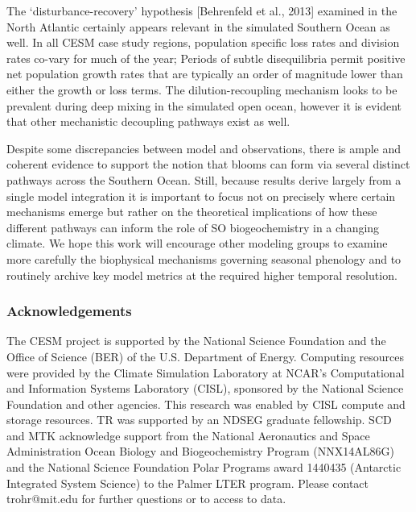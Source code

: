 The `disturbance-recovery' hypothesis [Behrenfeld et al., 2013] examined in the North Atlantic certainly appears relevant in the simulated Southern Ocean as well. In all CESM case study regions, population specific loss rates and division rates co-vary for much of the year; Periods of subtle disequilibria permit positive net population growth rates that are typically an order of magnitude lower than either the growth or loss terms. The dilution-recoupling mechanism looks to be prevalent during deep mixing in the simulated open ocean, however it is evident that other mechanistic decoupling pathways exist as well.

Despite some discrepancies between model and observations, there is ample and coherent evidence to support the notion that blooms can form via several distinct pathways across the Southern Ocean. Still, because results derive largely from a single model integration it is important to focus not on precisely where certain mechanisms emerge but rather on the theoretical implications of how these different pathways can inform the role of SO biogeochemistry in a changing climate. We hope this work will encourage other modeling groups to examine more carefully the biophysical mechanisms governing seasonal phenology and to routinely archive key model metrics at the required higher temporal resolution.

\subsubsection{Acknowledgements}
The CESM project is supported by the National Science Foundation and the Office of Science (BER) of the U.S. Department of Energy. Computing resources were provided by the Climate Simulation Laboratory at NCAR’s Computational and Information Systems Laboratory (CISL), sponsored by the National Science Foundation and other agencies. This research was enabled by CISL compute and storage resources. TR was supported by an NDSEG graduate fellowship. SCD and  MTK acknowledge support from the National Aeronautics and Space Administration Ocean Biology and Biogeochemistry Program (NNX14AL86G) and the National Science Foundation Polar Programs award 1440435 (Antarctic Integrated System Science) to the Palmer LTER program. Please contact trohr@mit.edu for further questions or to access to data. 








